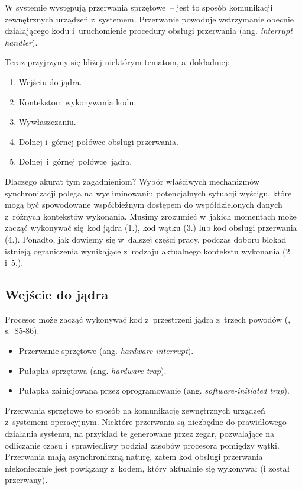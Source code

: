 \documentclass[shortabstract]{iithesis}
\theoremstyle{definition} \newtheorem*{definition}{Definicja}
\theoremstyle{definition} \newtheorem*{example}{Przykład}
\theoremstyle{definition} \newtheorem*{remark}{Uwaga}
\begin{document}
W systemie występują przerwania sprzętowe~-- jest to sposób komunikacji zewnętrznych urządzeń
z~systemem. Przerwanie powoduje wstrzymanie obecnie działającego kodu i~uruchomienie procedury obsługi
przerwania (ang. \textit{interrupt handler}).

Teraz przyjrzymy się bliżej niektórym tematom, a~dokładniej:
\begin{enumerate}
\item Wejściu do jądra.
\item Kontekstom wykonywania kodu.
\item Wywłaszczaniu.
\item Dolnej i~górnej połówce obsługi przerwania.
\item Dolnej i~górnej połówce jądra.
\end{enumerate}

Dlaczego akurat tym zagadnieniom? Wybór właściwych mechanizmów synchronizacji polega na wyeliminowaniu
potencjalnych sytuacji wyścigu, które mogą być spowodowane współbieżnym dostępem do współdzielonych danych
z~różnych kontekstów wykonania. Musimy zrozumieć w~jakich momentach może zacząć wykonywać się kod
jądra (1.), kod wątku (3.) lub kod obsługi przerwania (4.). Ponadto, jak dowiemy się w~dalszej części pracy,
podczas doboru blokad istnieją ograniczenia wynikające z~rodzaju aktualnego kontekstu wykonania (2. i~5.).

\subsection{Wejście do jądra}

Procesor może zacząć wykonywać kod z~przestrzeni jądra z~trzech powodów (\cite{bib:freebsd}, s.~85-86).

\begin{itemize}
\item Przerwanie sprzętowe (ang. \textit{hardware interrupt}).
\item Pułapka sprzętowa (ang. \textit{hardware trap}).
\item Pułapka zainicjowana przez oprogramowanie (ang. \textit{software-initiated trap}).
\end{itemize}

Przerwania sprzętowe to sposób na komunikację zewnętrznych urządzeń z~systemem operacyjnym. Niektóre
przerwania są niezbędne do prawidłowego działania systemu, na przykład te generowane przez zegar,
pozwalające na odliczanie czasu i~sprawiedliwy podział zasobów procesora pomiędzy wątki. Przerwania
mają asynchroniczną naturę, zatem kod obsługi przerwania niekoniecznie jest powiązany z~kodem, który aktualnie
się wykonywał (i został przerwany).
\end{document}
